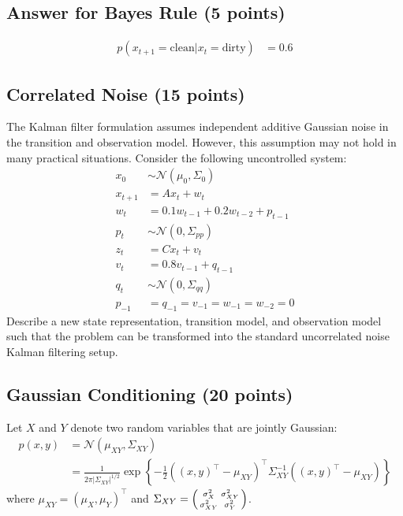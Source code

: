 \documentclass{article}
\newcommand{\?}{\stackrel{?}{=}}
\begin{document}
\clearpage

\subsection{Answer for Bayes Rule (5 points)}
\begin{align*}
  p(x_{t+1} = \text{clean} | x_{t} = \text{dirty}) &= 0.6
\end{align*}

\subsection{Correlated Noise (15 points)}
The Kalman filter formulation assumes independent additive Gaussian noise in the transition and observation model.
However, this assumption may not hold in many practical situations.
Consider the following uncontrolled system:
\begin{align*}
  x_0 &\sim \mathcal{N}(\mu_0, \Sigma_0) \\
  x_{t+1} &= A x_t + w_t \\
  w_{t} &= 0.1 w_{t-1} + 0.2 w_{t-2} + p_{t-1} \\
  p_t &\sim \mathcal{N}(0, \Sigma_{pp}) \\
  z_t &= Cx_t + v_t \\
  v_t &= 0.8 v_{t-1} + q_{t-1} \\
  q_t &\sim \mathcal{N}(0, \Sigma_{qq}) \\
  p_{-1} &= q_{-1} = v_{-1} = w_{-1} = w_{-2} = 0
\end{align*}
Describe a new state representation, transition model, and observation model such that the problem can be transformed into the standard uncorrelated noise Kalman filtering setup.


\subsection{Gaussian Conditioning (20 points)}

Let $X$ and $Y$ denote two random variables that are jointly Gaussian:
\begin{align*}
  p(x, y)
  &= \mathcal{N}(\mu_{XY}, \Sigma_{XY}) \\
  &= \frac{1}{2 \pi |\Sigma_{XY}|^{1/2}}
    \exp \left\{ -\frac{1}{2} ((x, y)^\top - \mu_{XY})^\top \Sigma_{XY}^{-1} ((x, y)^\top - \mu_{XY}) \right\}
\end{align*}
where $\mu_{XY} = (\mu_{X}, \mu_{Y})^\top$ and
$\Sigma_{XY} = \begin{psmallmatrix} \sigma_X^2 & \sigma_{XY}^2 \\ \sigma_{XY}^2 & \sigma_Y^2 \end{psmallmatrix}$.
\end{document}
